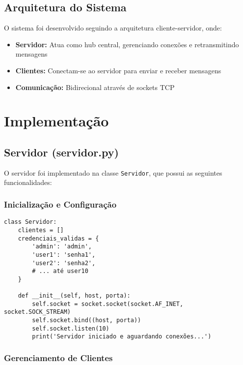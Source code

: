 \documentclass[12pt,a4paper]{article}
\begin{document}
\subsection{Arquitetura do Sistema}

O sistema foi desenvolvido seguindo a arquitetura cliente-servidor, onde:

\begin{itemize}
    \item \textbf{Servidor:} Atua como hub central, gerenciando conexões e retransmitindo mensagens
    \item \textbf{Clientes:} Conectam-se ao servidor para enviar e receber mensagens
    \item \textbf{Comunicação:} Bidirecional através de sockets TCP
\end{itemize}

\section{Implementação}

\subsection{Servidor (servidor.py)}

O servidor foi implementado na classe \texttt{Servidor}, que possui as seguintes funcionalidades:

\subsubsection{Inicialização e Configuração}

\begin{lstlisting}[caption=Inicialização do servidor]
class Servidor:
    clientes = []
    credenciais_validas = {
        'admin': 'admin',
        'user1': 'senha1',
        'user2': 'senha2',
        # ... até user10
    }
    
    def __init__(self, host, porta):
        self.socket = socket.socket(socket.AF_INET, socket.SOCK_STREAM)
        self.socket.bind((host, porta))
        self.socket.listen(10)
        print('Servidor iniciado e aguardando conexões...')
\end{lstlisting}

\subsubsection{Gerenciamento de Clientes}
\end{document}
